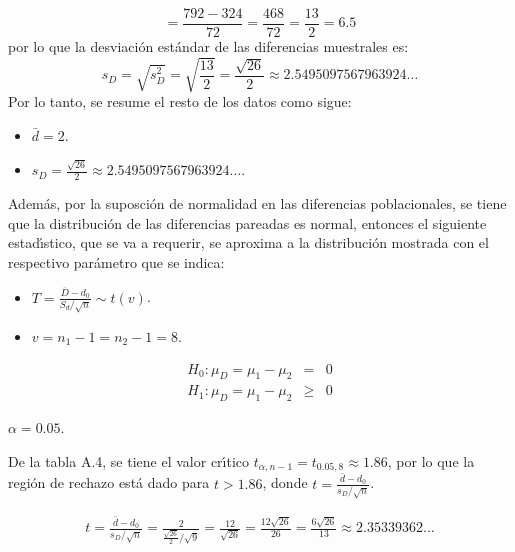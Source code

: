 \begin{solucion}
\begin{datos}
\begin{equation*}
   = \frac{792 - 324}{72} = \frac{468}{72}
   = \frac{13}{2} = 6.5
  \end{equation*}
  por lo que la desviaci\'on est\'andar de las diferencias muestrales es:
  \begin{equation*}
   s_D = \sqrt{s_D^2} = \sqrt{\frac{13}{2}} = \frac{\sqrt{26}}{2}
   \approx 2.5495097567963924\ldots
  \end{equation*}
  Por lo tanto, se resume el resto de los datos como sigue:
  \begin{itemize}
   \item $\bar{d} = 2$.
   \item $s_D = \frac{\sqrt{26}}{2} \approx 2.5495097567963924\ldots$.
  \end{itemize}
  Adem\'as, por la suposci\'on de normalidad
  en las diferencias poblacionales, se tiene
  que la distribuci\'on de las diferencias pareadas es normal,
  entonces el siguiente estad\'{\i}stico, que se va a requerir,
  se aproxima a la distribuci\'on mostrada
  con el respectivo par\'ametro que se indica:
  \begin{itemize}
   \item $T = \frac{\overline{D}-d_0}{S_d/\sqrt{n}} \sim t(v)$.
   \item $v = n_1 - 1 = n_2 - 1 = 8$.
  \end{itemize}
 \end{datos}

 \begin{hipotesis}
  \begin{eqnarray*}
   H_0: \mu_D = \mu_1 - \mu_2 &   =  & 0 \\
   H_1: \mu_D = \mu_1 - \mu_2 & \geq & 0
  \end{eqnarray*}
 \end{hipotesis}

 \begin{significancia}
  $\alpha = 0.05$.
 \end{significancia}

 \begin{region}
  De la tabla A.4, se tiene el valor cr\'{\i}tico
  $t_{\alpha,n-1} = t_{0.05,8} \approx 1.86$,
  por lo que la regi\'on de rechazo est\'a dado para $t > 1.86$,
  donde $t = \frac{\bar{d} - d_0}{s_D/\sqrt{n}}$.
 \end{region}

 \begin{estadistico}
  \begin{eqnarray*}
   t = \frac{\bar{d} - d_0}{s_D/\sqrt{n}}
   = \frac{2}{\frac{\sqrt{26}}{2}/\sqrt{9}}
   = \frac{12}{\sqrt{26}} = \frac{12\sqrt{26}}{26}
   = \frac{6\sqrt{26}}{13}
   \approx 2.35339362\ldots
  \end{eqnarray*}
 \end{estadistico}


\end{solucion}
